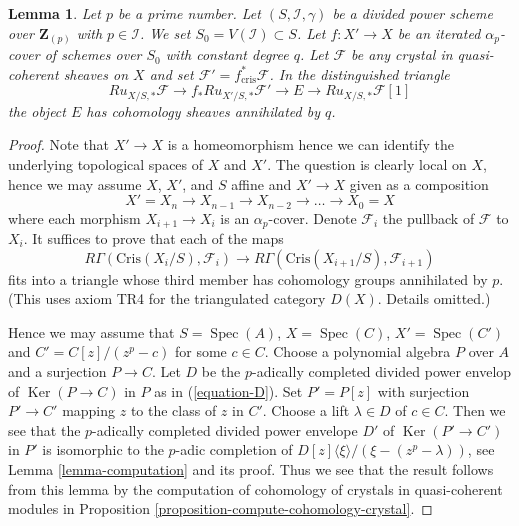 \documentclass{stacks-project}
\theoremstyle{plain}
\newtheorem{lemma}[subsection]{Lemma}
\theoremstyle{definition}
\theoremstyle{remark}
\numberwithin{equation}{subsection}
\def\Spec{\mathop{\mathrm{Spec}}}
\def\Ker{\mathop{\mathrm{Ker}}}
\begin{document}
\begin{lemma}
\label{lemma-pullback-along-p-power-cover}
Let $p$ be a prime number. Let $(S, \mathcal{I}, \gamma)$ be a divided power
scheme over $\mathbf{Z}_{(p)}$ with $p \in \mathcal{I}$. We set
$S_0 = V(\mathcal{I}) \subset S$. Let $f : X' \to X$ be an iterated
$\alpha_p$-cover of schemes over $S_0$ with constant degree $q$. Let
$\mathcal{F}$ be any crystal in quasi-coherent sheaves on $X$ and set
$\mathcal{F}' = f_{\text{cris}}^*\mathcal{F}$.
In the distinguished triangle
$$
Ru_{X/S, *}\mathcal{F}
\longrightarrow
f_*Ru_{X'/S, *}\mathcal{F}'
\longrightarrow
E
\longrightarrow
Ru_{X/S, *}\mathcal{F}[1]
$$
the object $E$ has cohomology sheaves annihilated by $q$.
\end{lemma}

\begin{proof}
Note that $X' \to X$ is a homeomorphism hence we can identify the underlying
topological spaces of $X$ and $X'$. The question is clearly local on $X$,
hence we may assume $X$, $X'$, and $S$ affine and $X' \to X$ given as a
composition
$$
X' = X_n \to X_{n - 1} \to X_{n - 2} \to \ldots \to X_0 = X
$$
where each morphism $X_{i + 1} \to X_i$ is an $\alpha_p$-cover.
Denote $\mathcal{F}_i$ the pullback of $\mathcal{F}$ to $X_i$.
It suffices to prove that each of the maps
$$
R\Gamma(\text{Cris}(X_i/S), \mathcal{F}_i)
\longrightarrow
R\Gamma(\text{Cris}(X_{i + 1}/S), \mathcal{F}_{i + 1})
$$
fits into a triangle whose third member has cohomology groups annihilated
by $p$. (This uses axiom TR4 for the triangulated category $D(X)$. Details
omitted.)

\medskip\noindent
Hence we may assume that $S = \Spec(A)$, $X = \Spec(C)$, $X' = \Spec(C')$
and $C' = C[z]/(z^p - c)$ for some $c \in C$. Choose a polynomial algebra
$P$ over $A$ and a surjection $P \to C$. Let $D$ be the $p$-adically completed
divided power envelop of $\Ker(P \to C)$ in $P$ as in (\ref{equation-D}).
Set $P' = P[z]$ with surjection $P' \to C'$ mapping $z$ to the class of $z$
in $C'$. Choose a lift $\lambda \in D$ of $c \in C$. Then we see that
the $p$-adically completed divided power envelope $D'$ of
$\Ker(P' \to C')$ in $P'$ is isomorphic to the $p$-adic completion of
$D[z]\langle \xi \rangle/(\xi - (z^p - \lambda))$, see
Lemma \ref{lemma-computation} and its proof.
Thus we see that the result follows from this lemma
by the computation of cohomology of crystals in quasi-coherent modules in
Proposition \ref{proposition-compute-cohomology-crystal}.
\end{proof}
\end{document}
